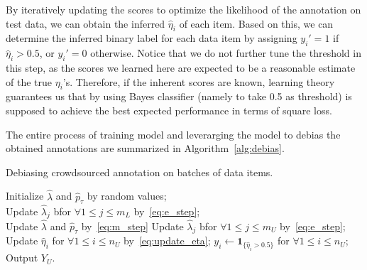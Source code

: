 By iteratively updating the scores to optimize the likelihood of the annotation on test data,
we can obtain the inferred $\hat{\eta}_i$ of each item.
Based on this, we can determine the inferred binary label for each data item by assigning $y_i'=1$ if $\hat{\eta}_i > 0.5$,
or $y_i'=0$ otherwise.
Notice that we do not further tune the threshold in this step,
as the scores we learned here are expected to be a reasonable estimate of the true $\eta_i$'s.
Therefore, if the inherent scores are known,
learning theory guarantees us that by using Bayes classifier (namely to take 0.5 as threshold)
is supposed to achieve the best expected performance in terms of square loss. %


The entire process of training model and leverarging the model to debias the obtained annotations 
are summarized in Algorithm~\ref{alg:debias}.  

\incmargin{1em}
\begin{algorithm}[!t]
       \caption{Debiasing crowdsourced annotation on batches of data items.}\label{alg:debias}
\small

       \BlankLine
       Initialize $\hat{\lambda}$ and $\hat{p}_{\tau}$ by random values; \\
       {
           Update $\hat{\lambda}_j$ bfor $\forall 1 \leq j \leq m_L$ by~\eqref{eq:e_step}; \\
           Update $\hat{\lambda}$ and $\hat{p}_{\tau}$ by~\eqref{eq:m_step}
       }
       \BlankLine
       {
       	   Update $\hat{\lambda}_j$ bfor $\forall 1 \leq j \leq m_U$ by~\eqref{eq:e_step}; \\
           Update $\hat{\eta}_i$ for $\forall 1 \leq i \leq n_U$ by~\eqref{eq:update_eta};
       }
       $y_i \leftarrow \mathbf{1}_{\{\hat{\eta}_i > 0.5\}}$ for $\forall 1 \leq i \leq n_U$; \\
       Output $Y_U$.
\end{algorithm}
\normalsize
\decmargin{1em}


